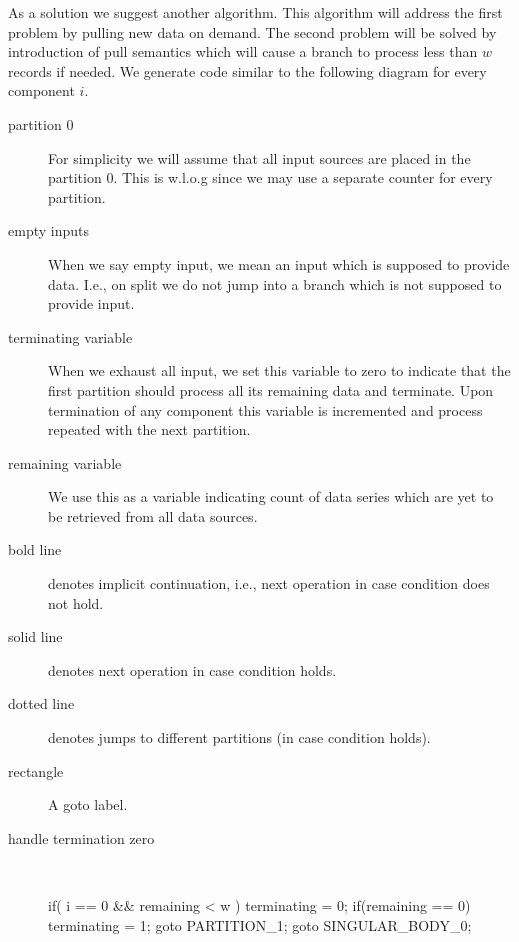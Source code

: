 As a solution we suggest another algorithm. This algorithm will address the first problem by pulling new data on demand. The second problem will be solved by introduction of pull semantics which will cause a branch to process less than $w$ records if needed. We generate code similar to the following diagram for every component $i$.


\begin{description}
 \item[partition 0] For simplicity we will assume that all input sources are placed in the partition 0. This is w.l.o.g since we may use a separate counter for every partition. 
  \item[empty inputs] When we say empty input, we mean an input which is supposed to provide data. I.e., on split we do not jump into a branch which is not supposed to provide input.
  \item[terminating variable] When we exhaust all input, we set this variable to zero to indicate that the first partition should process all its remaining data and terminate. Upon termination of any component this variable is incremented and process repeated with the next partition.
  \item[remaining variable] We use this as a variable indicating count of data series which are yet to be retrieved from all data sources. 
  \item[bold line] denotes implicit continuation, i.e., next operation in case condition does not hold. 
  \item[solid line] denotes next operation in case condition holds.
  \item[dotted line] denotes jumps to different partitions (in case condition holds).
  \item[rectangle] A goto label.
  \item[handle termination zero] \ \ \ 
\begin{samepage}
\begin{code}
if( i == 0 && remaining < w )                            
{                                                          
  terminating = 0;                                     
  if(remaining == 0)                                   
  {                                                    
    terminating = 1;                                   
    goto PARTITION_1;                            
  }                                                    
  goto SINGULAR_BODY_0;
}                                                      

\end{code}
\end{samepage}
\end{description}
